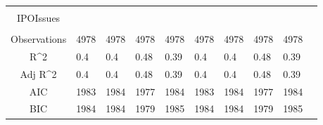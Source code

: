 \documentclass{article}
\begin{document}
\begin{table}[H]
\begin{tabular}{|clllllllll|}
   &  &  &  &  &  &  &  &  & \\ 
  IPOIssues &  &  &  &  &  &  &  &  & \\ 
   &  &  &  &  &  &  &  &  & \\ 
  \hline 
 Observations & 4978 & 4978 & 4978 & 4978 & 4978 & 4978 & 4978 & 4978 & \\ 
  R^2 & 0.4 & 0.4 & 0.48 & 0.39 & 0.4 & 0.4 & 0.48 & 0.39 & \\ 
  Adj R^2 & 0.4 & 0.4 & 0.48 & 0.39 & 0.4 & 0.4 & 0.48 & 0.39 & \\ 
  AIC & 1983 & 1984 & 1977 & 1984 & 1983 & 1984 & 1977 & 1984 & \\ 
  BIC & 1984 & 1984 & 1979 & 1985 & 1984 & 1984 & 1979 & 1985 & \\ 
   \hline
\end{tabular}
 
\end{table}
\end{document}
